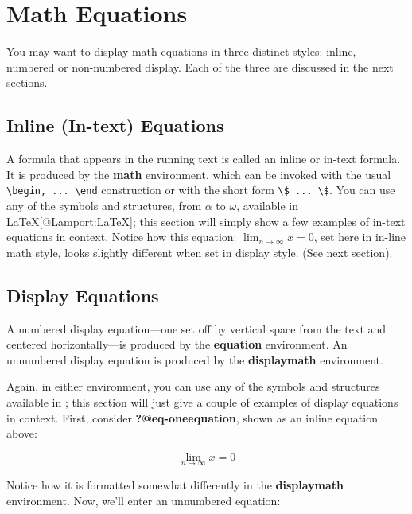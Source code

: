 \documentclass[
  letterpaper,
  DIV=11,
  numbers=noendperiod]{scrartcl}
\begin{document}
\hypertarget{math-equations}{%
\section{Math Equations}\label{math-equations}}

You may want to display math equations in three distinct styles: inline,
numbered or non-numbered display. Each of the three are discussed in the
next sections.

\hypertarget{inline-in-text-equations}{%
\subsection{Inline (In-text) Equations}\label{inline-in-text-equations}}

A formula that appears in the running text is called an inline or
in-text formula. It is produced by the \textbf{math} environment, which
can be invoked with the usual
\texttt{\textbackslash{}begin,\ ...\ \textbackslash{}end} construction
or with the short form
\texttt{\textbackslash{}\$\ ...\ \textbackslash{}\$}. You can use any of
the symbols and structures, from \(\alpha\) to \(\omega\), available in
\LaTeX{[}@Lamport:LaTeX{]}; this section will simply show a few examples
of in-text equations in context. Notice how this equation:
\(\lim_{n\rightarrow \infty}x=0\), set here in in-line math style, looks
slightly different when set in display style. (See next section).

\hypertarget{display-equations}{%
\subsection{Display Equations}\label{display-equations}}

A numbered display equation---one set off by vertical space from the
text and centered horizontally---is produced by the \textbf{equation}
environment. An unnumbered display equation is produced by the
\textbf{displaymath} environment.

Again, in either environment, you can use any of the symbols and
structures available in \LaTeX@; this section will just give a couple of
examples of display equations in context. First, consider
\textbf{?@eq-oneequation}, shown as an inline equation above:

\[
\lim_{n\rightarrow \infty}x=0
\]

Notice how it is formatted somewhat differently in the
\textbf{displaymath} environment. Now, we'll enter an unnumbered
equation:
\end{document}
